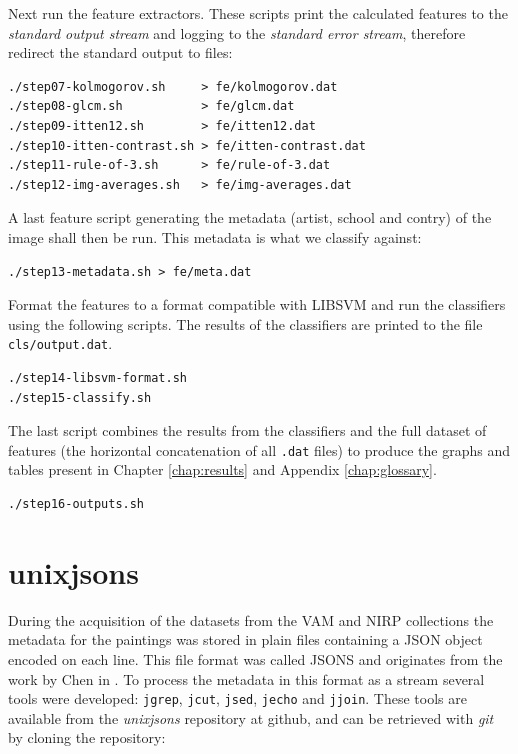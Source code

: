 \documentclass[11pt,a4paper,twoside,openright]{report}
\begin{document}
Next run the feature extractors.  These scripts print the calculated features
to the \emph{standard output stream} and logging to the \emph{standard error
stream}, therefore redirect the standard output to files:

\begin{Verbatim}[frame=leftline]
./step07-kolmogorov.sh     > fe/kolmogorov.dat
./step08-glcm.sh           > fe/glcm.dat
./step09-itten12.sh        > fe/itten12.dat
./step10-itten-contrast.sh > fe/itten-contrast.dat
./step11-rule-of-3.sh      > fe/rule-of-3.dat
./step12-img-averages.sh   > fe/img-averages.dat
\end{Verbatim}

A last feature script generating the metadata (artist, school and contry) of
the image shall then be run.  This metadata is what we classify against:

\begin{Verbatim}[frame=leftline]
./step13-metadata.sh > fe/meta.dat
\end{Verbatim}

Format the features to a format compatible with LIBSVM and run the classifiers
using the following scripts.  The results of the classifiers are printed to the
file \texttt{cls/output.dat}.

\begin{Verbatim}[frame=leftline]
./step14-libsvm-format.sh
./step15-classify.sh
\end{Verbatim}

The last script combines the results from the classifiers and the full dataset
of features (the horizontal concatenation of all \texttt{.dat} files) to
produce the graphs and tables present in Chapter \ref{chap:results} and
Appendix \ref{chap:glossary}.

\begin{Verbatim}[frame=leftline]
./step16-outputs.sh
\end{Verbatim}

\chapter{unixjsons}
\label{chap:unixjsons}

During the acquisition of the datasets from the VAM and NIRP collections the
metadata for the paintings was stored in plain files containing a JSON object
encoded on each line.  This file format was called JSONS and originates from
the work by Chen in \cite{chen09yahoo}.  To process the metadata in this format
as a stream several tools were developed: \texttt{jgrep}, \texttt{jcut},
\texttt{jsed}, \texttt{jecho} and \texttt{jjoin}.  These tools are available
from the \emph{unixjsons} repository at github, and can be retrieved with
\emph{git} by cloning the repository:
\end{document}
